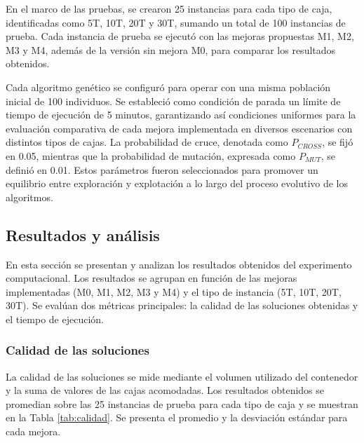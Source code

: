 En el marco de las pruebas, se crearon 25 instancias para cada tipo de caja, identificadas como 5T, 10T, 20T y 30T, sumando un total de 100 instancias de prueba. Cada instancia de prueba se ejecutó con las mejoras propuestas M1, M2, M3 y M4, además de la versión sin mejora M0, para comparar los resultados obtenidos.

Cada algoritmo genético se configuró para operar con una misma población inicial de 100 individuos. Se estableció como condición de parada un límite de tiempo de ejecución de 5 minutos, garantizando así condiciones uniformes para la evaluación comparativa de cada mejora implementada en diversos escenarios con distintos tipos de cajas. La probabilidad de cruce, denotada como $P_{CROSS}$, se fijó en 0.05, mientras que la probabilidad de mutación, expresada como $P_{MUT}$, se definió en 0.01. Estos parámetros fueron seleccionados para promover un equilibrio entre exploración y explotación a lo largo del proceso evolutivo de los algoritmos.

\subsection{Resultados y análisis}

En esta sección se presentan y analizan los resultados obtenidos del experimento computacional. Los resultados se agrupan en función de las mejoras implementadas (M0, M1, M2, M3 y M4) y el tipo de instancia (5T, 10T, 20T, 30T). Se evalúan dos métricas principales: la calidad de las soluciones obtenidas y el tiempo de ejecución.

\subsubsection{Calidad de las soluciones}

La calidad de las soluciones se mide mediante el volumen utilizado del contenedor y la suma de valores de las cajas acomodadas. Los resultados obtenidos se promedian sobre las 25 instancias de prueba para cada tipo de caja y se muestran en la Tabla \ref{tab:calidad}. Se presenta el promedio y la desviación estándar para cada mejora.

